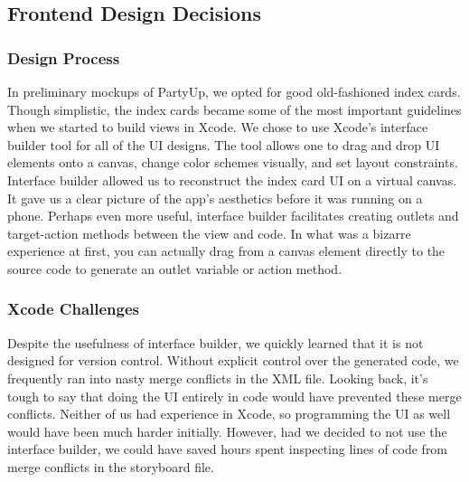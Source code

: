 \documentclass[12pt]{article}
\begin{document}

\subsection{Frontend Design Decisions}

\subsubsection{Design Process}


In preliminary mockups of PartyUp, we opted for good old-fashioned index cards. Though simplistic, the index cards became some of the most important guidelines when we started to build views in Xcode.
We chose to use Xcode's interface builder tool for all of the UI designs. The tool allows one to drag and drop UI elements onto a canvas, change color schemes visually, and set layout constraints.
Interface builder allowed us to reconstruct the index card UI on a virtual canvas. It gave us a clear picture of the app's aesthetics before it was running on a phone. 
Perhaps even more useful, interface builder facilitates creating outlets and target-action methods between the view and code. 
In what was a bizarre experience at first, you can actually drag from a canvas element directly to the source code to generate an outlet variable or action method. 

\bigskip

\subsubsection{Xcode Challenges}

Despite the usefulness of interface builder, we quickly learned that it is not designed for version control.
Without explicit control over the generated code, we frequently ran into nasty merge conflicts in the XML file.
Looking back, it's tough to say that doing the UI entirely in code would have prevented these merge conflicts. 
Neither of us had experience in Xcode, so programming the UI as well would have been much harder initially. 
However, had we decided to not use the interface builder, we could have saved hours spent inspecting lines of code from merge conflicts in the storyboard file. 

\bigskip
\end{document}
